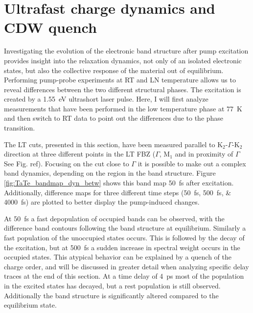 \section{Ultrafast charge dynamics and CDW quench}

Investigating the evolution of the electronic band structure after pump excitation provides insight into the relaxation dynamics, not only of an isolated electronic states, but also the collective response of the material out of equilibrium.
Performing pump-probe experiments at RT and LN temperature allows us to reveal differences between the two different structural phases.
The excitation is created by a \qty{1.55}{\electronvolt} ultrashort laser pulse.
Here, I will first analyze measurements that have been performed in the low temperature phase at \qty{77}{\kelvin} and then switch to RT data to point out the differences due to the phase transition.

The LT cuts, presented in this section, have been measured parallel to K$_2$-$\Gamma$-K$_2$ direction at three different points in the LT FBZ ($\Gamma$, M$_1$ and in proximity of $\Gamma$ See Fig. ref).
Focusing on the cut close to $\Gamma$ it is possible to make out a complex band dynamics, depending on the region in the band structure.
Figure \ref{fig:TaTe_bandmap_dyn_betw} shows this band map \qty{50}{\femto\second} after excitation.
Additionally, difference maps for three different time steps (\qtylist{50; 500; 4000}{\femto\second}) are plotted to better display the pump-induced changes.

At \qty{50}{\femto\second} a fast depopulation of occupied bands can be observed, with the difference band contours following the band structure at equilibrium.
Similarly a fast population of the unoccupied states occurs.
This is followed by the decay of the excitation, but at \qty{500}{\femto\second} a sudden increase in spectral weight occurs in the occupied states.
This atypical behavior can be explained by a quench of the charge order, and will be discussed in greater detail when analyzing specific delay traces at the end of this section.
At a time delay of \qty{4}{\pico\second} most of the population in the excited states has decayed, but a rest population is still observed.
Additionally the band structure is significantly altered compared to the equilibrium state.


